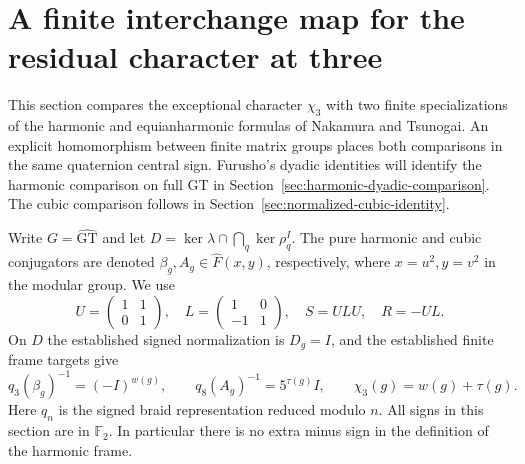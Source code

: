 \section{A finite interchange map for the residual character at three}

This section compares the exceptional character $\chi_3$ with two
finite specializations of the harmonic and equianharmonic formulas of
Nakamura and Tsunogai.  An explicit homomorphism between finite matrix
groups places both comparisons in the same quaternion central sign.
Furusho's dyadic identities will identify the harmonic comparison
on full GT in Section~\ref{sec:harmonic-dyadic-comparison}. The
cubic comparison follows in Section~\ref{sec:normalized-cubic-identity}.

Write $G=\widehat{\mathrm{GT}}$ and let
$D=\ker\lambda\cap\bigcap_q\ker\rho_q^I$.  The pure harmonic and
cubic conjugators are denoted $\beta_g,A_g\in\widehat F(x,y)$,
respectively, where $x=u^2,y=v^2$ in the modular group.
We use
\[
 U=\begin{pmatrix}1&1\\0&1\end{pmatrix},\quad
 L=\begin{pmatrix}1&0\\-1&1\end{pmatrix},\quad
 S=ULU,\quad R=-UL.
\]
On $D$ the established signed normalization is $D_g=I$, and the
established finite frame targets give
\[
 q_3(\beta_g)^{-1}=(-I)^{w(g)},\qquad
 q_8(A_g)^{-1}=5^{\tau(g)}I,\qquad
 \chi_3(g)=w(g)+\tau(g).
\]
Here $q_n$ is the signed braid representation reduced modulo $n$.
All signs in this section are in $\mathbb F_2$.  In particular there is
no extra minus sign in the definition of the harmonic frame.

